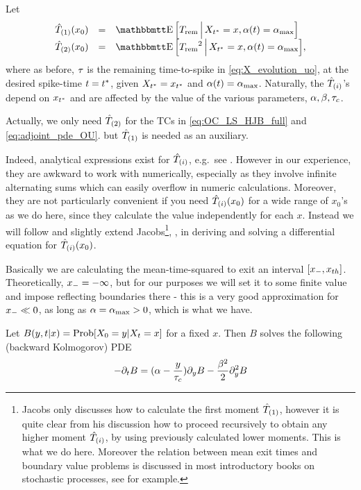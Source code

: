 \documentclass[12pt]{iopart}
\begin{document}
Let
\begin{equation}
\begin{array}{lcl}
\Tone(x_0) &=& \Exp \Big[\trem \,\Big|\, X_\T = x, \a(t) = \amax
\Big]
\\
\Ttwo(x_0) &=&
\Exp \Big[\trem^2 \,\Big|\, X_\T = x, \a(t) = \amax \Big],
\end{array}
\end{equation}
where as before, ${\tau}$ is the remaining time-to-spike in
\cref{eq:X_evolution_uo}, at the desired spike-time $t={ t^* }$, given $X_{ t^* } = x_{ t^* }$
and ${\alpha}(t) = { {\alpha}_{\textrm{max}} }$.
Naturally, the ${ \hat{T}_{(i)} }$'s depend on $x_{ t^* }$ and are affected by the value of the
various parameters, ${\alpha},{\beta},{ \tau_{c} }$.

Actually, we only  need ${ \hat{T}_{(2)} }$ for the TCs in \cref{eq:OC_LS_HJB_full} and \cref{eq:adjoint_pde_OU}.
but ${ \hat{T}_{(1)} }$ is needed as an auxiliary.

Indeed, analytical expressions exist for ${ \hat{T}_{(i)} }$, e.g.\ see \cite{Inoue1995}.
However in our experience, they are awkward to work with numerically, especially
as they involve infinite alternating sums which can easily overflow in numeric
calculations. Moreover, they are not particularly convenient if you need ${ \hat{T}_{(i)} }
(x_0)$ for a wide range of $x_0$'s as we do here, since they calculate the value
independently for each $x$. Instead we will follow and slightly extend Jacobs\footnote{Jacobs only discusses how to calculate the first moment
${ \hat{T}_{(1)} }$, however it is quite clear from his discussion how to proceed
recursively to obtain any higher moment ${ \hat{T}_{(i)} }$, by using previously calculated
lower moments. This is what we do here. Moreover the relation between mean exit
times and boundary value problems is discussed in most
introductory books on stochastic processes, see \cite{Oksendal2007} for
example.}, \cite{Jacobs}, in deriving and solving a differential equation for
${ \hat{T}_{(i)} }(x_0)$.

Basically we are calculating the mean-time-squared to exit an interval $[{ x_{-} },
{ x_{th} }]$. Theoretically, ${ x_{-} } = -\infty$, but for our purposes we will set it to
some finite value and impose reflecting boundaries there - this is a very good
approximation for ${ x_{-} } \ll 0$, as long as ${\alpha} = { {\alpha}_{\textrm{max}} } >0$, which is what we
have.

Let $B(y,t|x) = \operatorname{Prob}[X_0 = y| X_t = x]$ for a fixed $x$. Then $B$ solves the
following (backward Kolmogorov) PDE
\begin{equation}
-{\partial}_t B = ({\alpha} - \frac y{{ \tau_{c} }}){\partial}_yB - \frac {{\beta}^2} 2 {\partial}_y^2 B
\label{eq:backward_Xdensity}
\end{equation}
\end{document}
